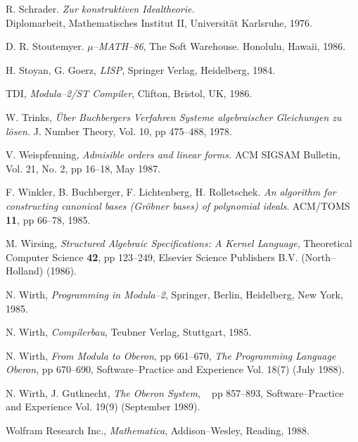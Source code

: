 \begin{thebibliography}{Stoutemyer 86}
 R. Schrader.
        {\em Zur konstruktiven Idealtheorie.} \\
        Diplomarbeit,
        Mathematisches Institut II,
        Universit\"at Karlsruhe, 1976.

 D. R. Stoutemyer.
        {\em $\mu$--MATH--86},
        The Soft Warehouse. Honolulu, Hawaii, 1986.

 H. Stoyan, G. Goerz,
        {\em LISP},
        Springer Verlag, Heidelberg, 1984.

 TDI,
        {\em Modula--2/ST Compiler},
        Clifton, Bristol, UK, 1986.

 W. Trinks,
        {\em \"Uber Buchbergers Verfahren Systeme algebraischer
        Gleichungen zu l\"osen.}
        J. Number Theory, Vol. 10, pp 475--488, 1978.

 V. Weispfenning,
        {\em Admisible orders and linear forms.}
        ACM SIGSAM Bulletin, Vol. 21, No. 2, pp 16--18, May 1987.

 F. Winkler, B. Buchberger,
        F. Lichtenberg, H. Rolletschek.
        {\em An algorithm for constructing canonical bases
        (Gr\"obner bases) of polynomial ideals}.
        ACM/TOMS {\bf 11}, pp 66--78, 1985.

 M. Wirsing,
        {\em Structured Algebraic Specifications:
        A Kernel Language},
        Theoretical Computer Science {\bf 42}, pp 123--249,
        Elsevier Science Publishers B.V. (North--Holland) (1986).

 N. Wirth,
        {\em Programming in Modula--2},
        Springer, Berlin, Heidelberg, New York, 1985.

 N. Wirth,
        {\em Compilerbau},
        Teubner Verlag, Stuttgart, 1985.

 N. Wirth,
        {\em From Modula to Oberon}, pp 661--670,
        {\em The Programming Language Oberon}, pp 670--690,
        Software--Practice and Experience Vol. 18(7) (July 1988).

 N. Wirth, J. Gutknecht,
        {\em The Oberon System}, \mbox{  } pp 857--893,
        Software--Practice and Experience Vol. 19(9) (September 1989).

 Wolfram Research Inc.,
        {\em Mathematica},
        Addison--Wesley, Reading, 1988.

\end{thebibliography}




